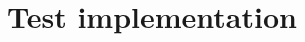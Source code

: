 \documentclass[11pt]{article}
\begin{document}
\pagebreak
\section{Test implementation}










% 


% 






\end{document}
